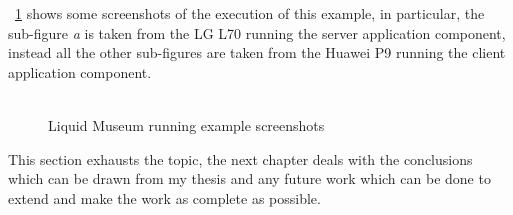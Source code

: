 \figurename~\ref{fig:5.12} shows some screenshots of the execution of this example, in particular, the sub-figure \textit{a} is taken from the LG L70 running the server application component, instead all the other sub-figures are taken from the Huawei P9 running the client application component. \\\\
\begin{figure}[ht!]
	\centering
	\begin{minipage}{.24\textwidth}\centering
	\end{minipage}
	\begin{minipage}{.24\textwidth}\centering
	\end{minipage}
	\centering
	\begin{minipage}{.24\textwidth}\centering
	\end{minipage}
	\begin{minipage}{.24\textwidth}\centering
	\end{minipage}
	\caption{Liquid Museum running example screenshots}
	\label{fig:5.12}
\end{figure}

\bigskip
\bigskip
\par This section exhausts the topic, the next chapter deals with the conclusions which can be drawn from my thesis and any future work which can be done to extend and make the work as complete as possible.